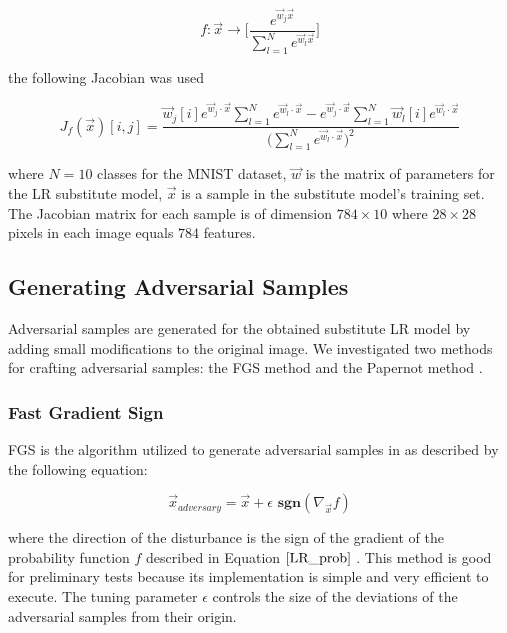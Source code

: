 \begin{equation} \label{LR_prob}
	f: \vec{x} \rightarrow \Bigg[ \frac{e^{\vec{w}_{j}\vec{x}}}{\sum_{l=1}^{N}e^{\vec{w}_{l}\vec{x}}} \Bigg]
\end{equation}

the following Jacobian was used

\begin{equation}
	J_{f}(\vec{x})[i,j] = \frac{\vec{w}_{j}[i] e^{\vec{w}_{j}\cdot \vec{x}}\sum_{l=1}^{N}e^{\vec{w}_{l} \cdot \vec{x}} - e^{\vec{w}_{j} \cdot \vec{x}}\sum_{l=1}^{N}\vec{w}_{l}[i]e^{\vec{w}_{l} \cdot \vec{x}}}{\bigg(\sum_{l=1}^{N}e^{\vec{w}_{l} \cdot \vec{x}}\bigg)^{2}}
\end{equation}

where $N = 10$ classes for the MNIST dataset, $\vec{w}$ is the matrix of parameters for the LR substitute model, $\vec{x}$ is a sample in the substitute model's training set. The Jacobian matrix for each sample is of dimension $784 \times 10$ where $28 \times 28$ pixels in each image equals $784$ features. 

\subsection{Generating Adversarial Samples}
Adversarial samples are generated for the obtained substitute LR model by adding small modifications to the original image. We investigated two methods for crafting adversarial samples: the FGS method \cite{fast_gradient_sign} and the Papernot method \cite{papernot1}.

\subsubsection{Fast Gradient Sign}
FGS is the algorithm utilized to generate adversarial samples in \cite{papernot3} as described by the following equation:

\begin{equation} \label{eqn:fast_gradient_sign}
	\vec{x}_{adversary} = \vec{x} + \epsilon \textbf{ sgn}(\nabla_{\vec{x}}f) 
\end{equation}

where the direction of the disturbance is the sign of the gradient of the probability function $f$ described in Equation $\ref{LR_prob}$ \cite{fast_gradient_sign}. This method is good for preliminary tests because its implementation is simple and very efficient to execute. The tuning parameter $\epsilon$ controls the size of the deviations of the adversarial samples from their origin.

